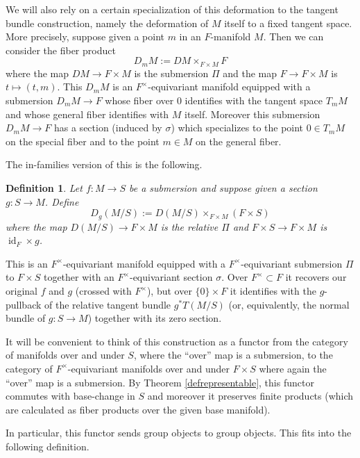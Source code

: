 \documentclass[12pt]{article}
\newtheorem{definition}[theorem]{Definition}
\newcommand{\on}{\operatorname}
\begin{document}
We will also rely on a certain specialization of this deformation to the tangent bundle construction, namely the deformation of $M$ itself to a fixed tangent space.  More precisely, suppose given a point $m$ in an $F$-manifold $M$.  Then we can consider the fiber product
$$D_mM:= DM\times_{F\times M}F$$
where the map $DM\rightarrow F\times M$ is the submersion $\Pi$ and the map $F\rightarrow F\times M$ is $t\mapsto (t,m)$.  This $D_mM$ is an $F^\times$-equivariant manifold equipped with a submersion $D_mM\rightarrow F$ whose fiber over $0$ identifies with the tangent space $T_mM$ and whose general fiber identifies with $M$ itself.  Moreover this submersion $D_mM\rightarrow F$ has a section (induced by $\sigma$) which specializes to the point $0\in T_mM$ on the special fiber and to the point $m\in M$ on the general fiber.

The in-families version of this is the following.

\begin{definition}\label{deformman}
Let $f:M\rightarrow S$ be a submersion and suppose given a section $g:S\rightarrow M$.  Define
$$D_g(M/S):= D(M/S)\times_{F\times M}(F\times S)$$
where the map $D(M/S)\rightarrow F\times M$ is the relative $\Pi$ and $F\times S\rightarrow F\times M$ is $\on{id}_F\times g$.
\end{definition}

This is an $F^\times$-equivariant manifold equipped with a $F^\times$-equivariant submersion $\Pi$ to $F\times S$ together with an $F^\times$-equivariant section $\sigma$.  Over $F^\times\subset F$ it recovers our original $f$ and $g$ (crossed with $F^\times$), but over $\{0\}\times F$ it identifies with the $g$-pullback of the relative tangent bundle  $g^\ast T(M/S)$ (or, equivalently, the normal bundle of $g:S\rightarrow M$) together with its zero section.

It will be convenient to think of this construction as a functor from the category of manifolds over and under $S$, where the ``over'' map is a submersion, to the category of $F^\times$-equivariant manifolds over and under $F\times S$ where again the ``over'' map is a submersion.  By Theorem \ref{defrepresentable}, this functor commutes with base-change in $S$ and moreover it preserves finite products (which are calculated as fiber products over the given base manifold).

In particular, this functor sends group objects to group objects.  This fits into the following definition.
\end{document}
